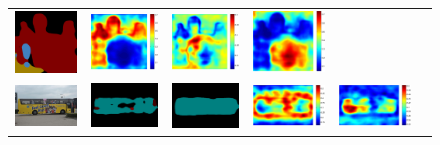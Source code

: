 \documentclass[10pt,twocolumn,letterpaper]{article}
\begin{document}
\begin{figure}
\begin{tabular}{c c c c c c}
   \includegraphics[height=0.13\linewidth]{fig/coco/res_sharenet/COCO_val2014_000000009007.png} &
   \includegraphics[height=0.13\linewidth]{fig/coco/att1/COCO_val2014_000000009007.pdf} &
   \includegraphics[height=0.13\linewidth]{fig/coco/att2/COCO_val2014_000000009007.pdf} &
   \includegraphics[height=0.13\linewidth]{fig/coco/att3/COCO_val2014_000000009007.pdf} \\
   \includegraphics[height=0.087\linewidth]{fig/coco/img/COCO_val2014_000000000985.jpg} &
   \includegraphics[height=0.087\linewidth]{fig/coco/res_baseline/COCO_val2014_000000000985.png} &
   \includegraphics[height=0.087\linewidth]{fig/coco/res_sharenet/COCO_val2014_000000000985.png} &
   \includegraphics[height=0.087\linewidth]{fig/coco/att1/COCO_val2014_000000000985.pdf} &
   \includegraphics[height=0.087\linewidth]{fig/coco/att2/COCO_val2014_000000000985.pdf} &

\end{tabular}
\end{figure}
\end{document}
